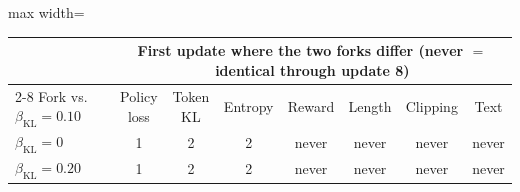 \begin{adjustbox}{max width=\linewidth}
\begin{tabular}{lccccccc}
\toprule
 & \multicolumn{7}{c}{First update where the two forks differ (never $=$ identical through update 8)} \\
\cmidrule(lr){2-8}
Fork vs.\ $\beta_{\mathrm{KL}} = 0.10$ & Policy loss & Token KL & Entropy & Reward & Length & Clipping & Text \\
\midrule
$\beta_{\mathrm{KL}} = 0$ & 1 & 2 & 2 & never & never & never & never \\
$\beta_{\mathrm{KL}} = 0.20$ & 1 & 2 & 2 & never & never & never & never \\
\bottomrule
\end{tabular}
\end{adjustbox}
